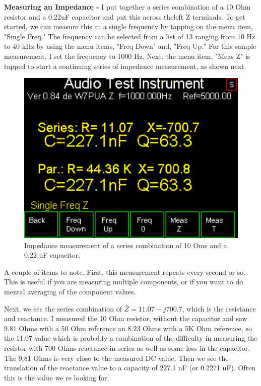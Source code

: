 \textbf{Measuring an Impedance - }I put together a series combination of a 10 Ohm resistor and a 0.22uF capacitor and put this across theleft Z terminals.  To get started, we can measure this at a single frequency by tapping on the menu item, "Single Freq."
The frequency can be selected from a list of 13 ranging from 10 Hz to 40 kHz by using the menu items, "Freq Down" and, "Freq Up."  For this sample measurement, I set the frequency to 1000 Hz.  Next, the menu item, "Meas Z" is tapped to start a continuing series of impedance measurement, as shown next.
\begin{figure}[H]
\begin{center}
\includegraphics[scale=0.75]{./images/AVNA_006.pdf}
\caption{Impedance measurement of a series combination of 10 Oms and a 0.22 uF capacitor.}
\label{AVNA_006-label}
\end{center}
\end{figure}
A couple of items to note.  First, this measurement repeats every second or so. 
This is useful if you are measuring multiple components, or if you want to do mental averaging of the component values.

Next, we see the series combination of  \(\bar{Z}=11.07 -j700.7\), which is the resistance and reactance. 
 I measured the 10 Ohm resistor, without the capacitor and saw 9.81 Ohms with a 50 Ohm reference an 8.23 Ohms with a 5K Ohm reference, so the 11.07 value which is probably a combination of the difficulty in measuring the resistor with 700 Ohms reactance in series as well as some loss in the capacitor.  The 9.81 Ohms is very close to the measured DC value. Then we see the translation of the reactance value to a capacity of 227.1 nF (or 0.2271 uF).  Often this is the value we re looking for.

